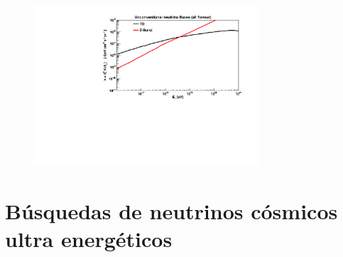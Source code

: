 	\begin{figure}[ht]
		\begin{center}
		\includegraphics[width=0.75\textwidth]{fig/introduccion/unconventional_nuFluxes}
		\caption{\label{fig:flujosNoConv} }
		\end{center}
	\end{figure}

\section{Búsquedas de neutrinos cósmicos ultra energéticos}


